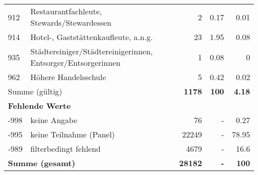 \begin{longtable}{lXrrr}
        912 & \multicolumn{1}{X}{Restaurantfachleute, Stewards/Stewardessen} & %
          \num{2} &
          \num[round-mode=places,round-precision=2]{0.17} &
          \num[round-mode=places,round-precision=2]{0.01} \\

        914 & \multicolumn{1}{X}{Hotel-, Gaststättenkaufleute, a.n.g.} & %
          \num{23} &
          \num[round-mode=places,round-precision=2]{1.95} &
          \num[round-mode=places,round-precision=2]{0.08} \\

        935 & \multicolumn{1}{X}{Städtereiniger/Städtereinigerinnen, Entsorger/Entsorgerinnen} & %
          \num{1} &
          \num[round-mode=places,round-precision=2]{0.08} &
          \num[round-mode=places,round-precision=2]{0} \\

        962 & \multicolumn{1}{X}{Höhere Handelsschule} & %
          \num{5} &
          \num[round-mode=places,round-precision=2]{0.42} &
          \num[round-mode=places,round-precision=2]{0.02} \\

     \midrule
     \multicolumn{2}{l}{Summe (gültig)} &
       \textbf{\num{1178}} &
     \textbf{100} &
       \textbf{\num[round-mode=places,round-precision=2]{4.18}} \\
     \multicolumn{5}{l}{\textbf{Fehlende Werte}}\\
       -998 &
       keine Angabe &
         \num{76} &
        - &
         \num[round-mode=places,round-precision=2]{0.27} \\
       -995 &
       keine Teilnahme (Panel) &
         \num{22249} &
        - &
         \num[round-mode=places,round-precision=2]{78.95} \\
       -989 &
       filterbedingt fehlend &
         \num{4679} &
        - &
         \num[round-mode=places,round-precision=2]{16.6} \\
     \midrule
     \multicolumn{2}{l}{\textbf{Summe (gesamt)}} &
          \textbf{\num{28182}} &
        \textbf{-} &
        \textbf{100} \\
     \bottomrule
     \end{longtable}
     
